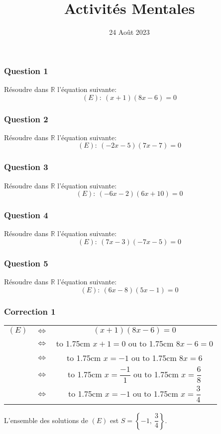 \documentclass[15pt, mathserif]{beamer}
\title{Activités Mentales}
\date{24 Août 2023}
\begin{document}
\begin{frame}
    \titlepage
\end{frame}

\begin{frame} 
	\frametitle{Question 1}
	Résoudre dans $\mathbb{R}$ l'équation suivante: \[(E):~ (x+1)(8x-6)=0\]\end{frame}


\begin{frame} 
	\frametitle{Question 2}
	Résoudre dans $\mathbb{R}$ l'équation suivante: \[(E):~ (-2x-5)(7x-7)=0\]\end{frame}


\begin{frame} 
	\frametitle{Question 3}
	Résoudre dans $\mathbb{R}$ l'équation suivante: \[(E):~ (-6x-2)(6x+10)=0\]\end{frame}


\begin{frame} 
	\frametitle{Question 4}
	Résoudre dans $\mathbb{R}$ l'équation suivante: \[(E):~ (7x-3)(-7x-5)=0\]\end{frame}


\begin{frame} 
	\frametitle{Question 5}
	Résoudre dans $\mathbb{R}$ l'équation suivante: \[(E):~ (6x-8)(5x-1)=0\]\end{frame}


\begin{frame}
\vspace{-10mm}
	\frametitle{Correction 1}
	\begin{tabular}{ccc} $(E)$ & $\Leftrightarrow$ & $(x+1)(8x-6)=0$  \\
		& $\Leftrightarrow$ &  \hbox to 1.75cm {\hfill $x+1= 0$\hfill} \quad  ou \quad  \hbox to 1.75cm {\hfill $8x-6=0$\hfill} \\
		 & $\Leftrightarrow$ & \hbox to 1.75cm {\hfill $x = -1$\hfill} \quad  ou \quad \hbox to 1.75cm {\hfill $8x = 6$\hfill} \\[1.5ex]
		 & $\Leftrightarrow$ & \hbox to 1.75cm {\hfill $x= \dfrac{-1}{1}$\hfill} \quad  ou \quad \hbox to 1.75cm {\hfill $x= \dfrac{6}{8}$\hfill} \\[2.5ex]
		 & $\Leftrightarrow$ & \hbox to 1.75cm {\hfill $x = -1$\hfill} \quad  ou \quad \hbox to 1.75cm {\hfill $x = \dfrac{3}{4}$\hfill}
	\end{tabular}

\bigskip

L'ensemble des solutions de $(E)$ est $S=\left\{-1,~\dfrac{3}{4}\right\}$.\end{frame}
\end{document}
